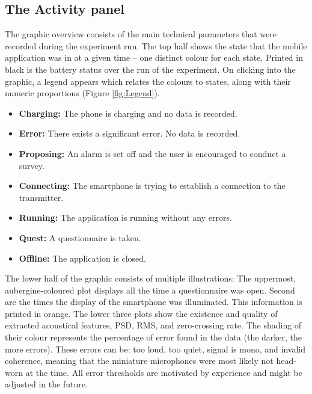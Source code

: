 \documentclass[11pt,a4paper,titlepage]{article}
\newcommand\ClrSquareBig[1]{\textcolor{#1}{\rule{10pt}{10pt}}}
\begin{document}
\subsection{The Activity panel}\label{sub:activity}


The graphic overview consists of the main technical parameters that were recorded during the experiment run. The top half shows the state that the mobile application was in at a given time -- one distinct colour for each state. Printed in black is the battery status over the run of the experiment. On clicking into the graphic, a legend appears which relates the colours to states, along with their numeric proportions (Figure \ref{fig:Legend}). 

\begin{itemize}
	\item [\ClrSquareBig{ml_charging}] \textbf{Charging:} The phone is charging and no data is recorded.
	\item [\ClrSquareBig{ml_error}] \textbf{Error:} There exists a significant error. No data is recorded.
	\item [\ClrSquareBig{ml_proposing}] \textbf{Proposing:} An alarm is set off and the user is encouraged to conduct a survey.
	\item [\ClrSquareBig{ml_connecting}] \textbf{Connecting:} The smartphone is trying to establish a connection to the transmitter.
	\item [\ClrSquareBig{ml_running}] \textbf{Running:} The application is running without any errors.
	\item [\ClrSquareBig{ml_quest}] \textbf{Quest:} A questionnaire is taken.
	\item [\ClrSquareBig{ml_offline}] \textbf{Offline:} The application is closed.
\end{itemize}

 The lower half of the graphic consists of multiple illustrations: The uppermost, aubergine-coloured plot displays all the time a questionnaire was open. Second are the times the display of the smartphone was illuminated. This information is printed in orange. The lower three plots show the existence and quality of extracted acoustical features, PSD, RMS, and zero-crossing rate. The shading of their colour represents the percentage of error found in the data (the darker, the more errors). These errors can be: too loud, too quiet, signal is mono, and invalid coherence, meaning that the miniature microphones were most likely not head-worn at the time. All error thresholds are motivated by experience and might be adjusted in the future.
\end{document}

